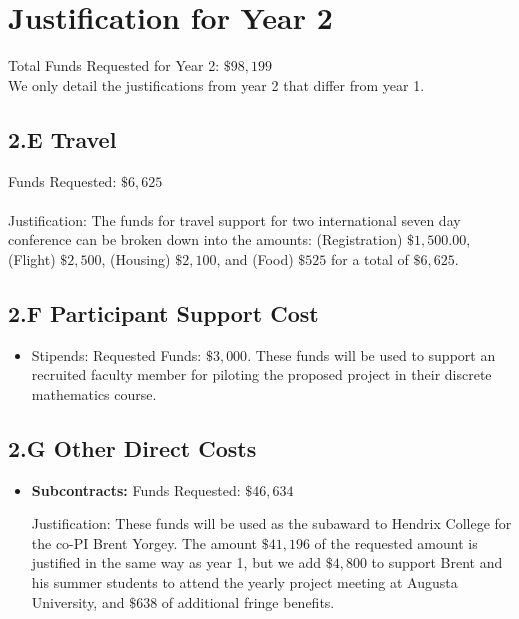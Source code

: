 \documentclass[11pt]{article}
\begin{document}
\section{Justification for Year 2}
\label{sec:justification_for_year_2}

Total Funds Requested for Year 2: $\$98,199$\\

\noindent
We only detail the justifications from year 2 that differ from year 1.

\subsection*{2.E Travel}
\label{subsec:travel}
Funds Requested: $\$6,625$\\ \ \\ Justification: The funds for travel
support for two international seven day conference can be broken down
into the amounts: (Registration) $\$1,500.00$, (Flight) $\$2,500$,
(Housing) $\$2,100$, and (Food) $\$525$ for a total of $\$6,625$.

\subsection*{2.F Participant Support Cost }
\label{subsec:2.f_participant_support_cost_}
\begin{itemize}
\item Stipends: Requested Funds: $\$3,000$.  These funds will be used
  to support an recruited faculty member for piloting the proposed
  project in their discrete mathematics course.
\end{itemize}

\subsection*{2.G Other Direct Costs}
\label{subsec:other}

\begin{itemize}
\item \textbf{Subcontracts:} Funds Requested: $\$46,634$

  Justification: These funds will be used as the subaward to Hendrix
  College for the co-PI Brent Yorgey.  The amount $\$41,196$ of the
  requested amount is justified in the same way as year 1, but we add
  $\$4,800$ to support Brent and his summer students to attend the
  yearly project meeting at Augusta University, and $\$638$ of
  additional fringe benefits.
\end{itemize}
\end{document}
